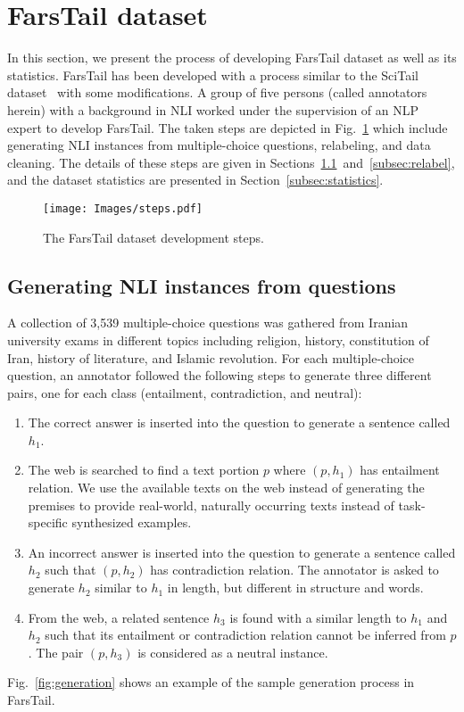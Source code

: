 \documentclass[preprint,12pt]{elsarticle}
\begin{document}
\section{FarsTail dataset}
\label{sec:farstail}
In this section, we present the process of developing FarsTail dataset as well as its statistics. FarsTail has been developed with a process similar to the SciTail dataset~\citep{khot2018scitail} with some modifications. A group of five persons (called annotators herein) with a background in NLI worked under the supervision of an NLP expert to develop FarsTail. The taken steps are depicted in Fig.~\ref{fig:farstail-steps} which include generating NLI instances from multiple-choice questions, relabeling, and data cleaning. The details of these steps are given in Sections~\ref{subsec:generate}~and~\ref{subsec:relabel}, and the dataset statistics are presented in Section~\ref{subsec:statistics}. 

\begin{figure}[t!]
    \centering
    \texttt{[image: Images/steps.pdf]}
    \caption{The FarsTail dataset development steps.}
    \label{fig:farstail-steps}
\end{figure}

\subsection{Generating NLI instances from questions}
\label{subsec:generate}
A collection of 3,539 multiple-choice questions was gathered from Iranian university exams in different topics including religion, history, constitution of Iran, history of literature, and Islamic revolution. For each multiple-choice question, an annotator followed the following steps to generate three different pairs, one for each class (entailment, contradiction, and neutral):
\begin{enumerate}
    \item The correct answer is inserted into the question to generate a sentence called $h_1$. 
    \item The web is searched to find a text portion $p$ where  $(p,h_1)$ has entailment relation. We use the available texts on the web instead of generating the premises to provide real-world, naturally occurring texts instead of task-specific synthesized examples. 
    \item An incorrect answer is inserted into the question to generate a sentence called $h_2$ such that $(p,h_2)$ has contradiction relation. The annotator is asked to generate $h_2$ similar to $h_1$ in length, but different in structure and words. 
    \item From the web, a related sentence $h_3$ is found with a similar length to $h_1$ and $h_2$ such that its entailment or contradiction relation cannot be inferred from $p$. The pair $(p,h_3)$ is considered as a neutral instance.
\end{enumerate}
Fig.~\ref{fig:generation} shows an example of the sample generation process in FarsTail. 
\end{document}
